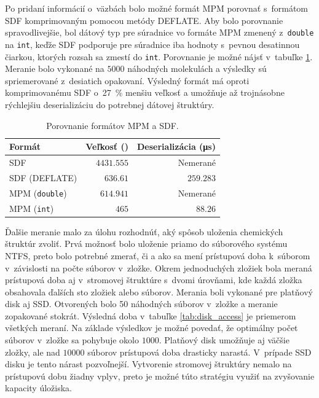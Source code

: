 \documentclass[slovak]{ExcelAtFIT} %
\begin{document}
Po pridaní informácií o~väzbách bolo možné formát MPM porovnať s~formátom SDF komprimovaným pomocou metódy DEFLATE. Aby bolo porovnanie spravodlivejšie, bol dátový typ pre súradnice vo formáte MPM zmenený z~\texttt{double} na \texttt{int}, keďže SDF podporuje pre súradnice iba hodnoty s~pevnou desatinnou čiarkou, ktorých rozsah sa zmestí do \texttt{int}. Porovnanie je možné nájsť v~tabuľke \ref{tab:sdfvsmpm}. Meranie bolo vykonané na $5000$ náhodných molekulách a výsledky sú spriemerované z~desiatich opakovaní. Výsledný formát má oproti komprimovanému SDF o~\SI{27}{\percent} menšiu veľkosť a umožňuje až trojnásobne rýchlejšiu deserializáciu do potrebnej dátovej štruktúry.

\begin{table}[h]
	\vskip6pt
	\caption{Porovnanie formátov MPM a SDF.}
	\centering
	\begin{tabular}{l|r|r}
		\toprule
		Formát & Veľkosť (\si{\byte}) & Deserializácia (\si{\micro\second}) \\
		\midrule
		SDF & $4431.555$ & Nemerané \\
		SDF (DEFLATE) & $636.61$ & $259.283$ \\
		MPM (\texttt{double}) & $614.941$ & Nemerané \\
		MPM (\texttt{int}) & $465$ & $88.26$ \\
		\bottomrule
	\end{tabular}
	\label{tab:sdfvsmpm}
\end{table}

Ďalšie meranie malo za úlohu rozhodnúť, aký spô\-sob uloženia chemických štruktúr zvoliť. Prvá možnosť bolo uloženie priamo do súborového systému NTFS, preto bolo potrebné zmerať, či a ako sa mení prístupová doba k~súborom v~závislosti na počte súborov v~zložke. Okrem jednoduchých zložiek bola meraná prístupová doba aj v~stromovej štruktúre s~dvomi úrovňami, kde každá zložka obsahovala ďalších sto zložiek alebo súborov. Merania boli vykonané pre platňový disk aj SSD. Otvorených bolo 50 náhodných súborov v~zložke a meranie zopakované stokrát. Výsledná doba v~tabuľke \ref{tab:disk_access} je priemerom všetkých meraní. Na základe výsledkov je možné povedať, že optimálny počet sú\-bo\-rov v~zložke sa pohybuje okolo $1000$. Platňový disk u\-mož\-ňu\-je aj väčšie zložky, ale nad $10000$ súborov prístupová doba drasticky narastá. V~prípade SSD disku je tento nárast pozvoľnejší. Vytvorenie stromovej štruktúry nemalo na prístupovú dobu žiadny vplyv, preto je možné túto stratégiu využiť na zvyšovanie kapacity úložiska. 
\end{document}
